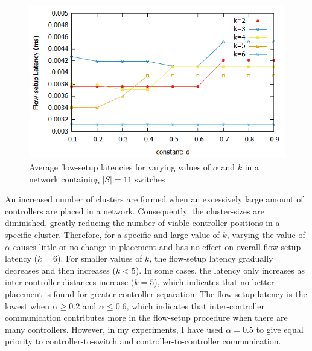 \documentclass[journal]{IEEEtran}
\begin{document}
\begin{figure}
	
	\centering
	\includegraphics[width=\linewidth]{Images/Abilene_Analysis.png}
	\caption{Average flow-setup latencies for varying values of $\alpha$ and $k$ in a network containing $|S|=11$ switches} \label{fig:abileneA}
	
\end{figure}

An increased number of clusters are formed when an excessively large amount of controllers are placed in a network. Consequently, the cluster-sizes are diminished, greatly reducing the number of viable controller positions in a specific cluster. Therefore, for a specific and large value of $k$, varying the value of $\alpha$ causes little or no change in placement and has no effect on overall flow-setup latency ($k=6$). For smaller values of $k$, the flow-setup latency gradually decreases and then increases ($k<5$). In some cases, the latency only increases as inter-controller distances increase ($k=5$), which indicates that no better placement is found for greater controller separation. The flow-setup latency is the lowest when $\alpha \ge 0.2$ and $\alpha \le 0.6$, which indicates that inter-controller communication contributes more in the flow-setup procedure when there are many controllers. However, in my experiments, I have used $\alpha=0.5$ to give equal priority to controller-to-switch and controller-to-controller communication.
\end{document}
